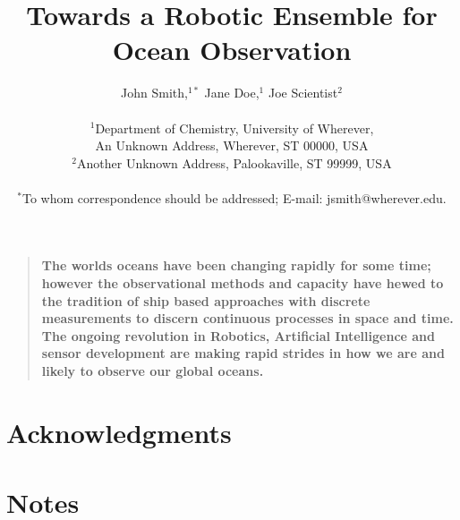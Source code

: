 \documentclass[12pt]{article}
\title{Towards a Robotic Ensemble for Ocean Observation}
\author
{John Smith,$^{1\ast}$ Jane Doe,$^{1}$ Joe Scientist$^{2}$\\
\\
\normalsize{$^{1}$Department of Chemistry, University of Wherever,}\\
\normalsize{An Unknown Address, Wherever, ST 00000, USA}\\
\normalsize{$^{2}$Another Unknown Address, Palookaville, ST 99999, USA}\\
\\
\normalsize{$^\ast$To whom correspondence should be addressed; E-mail:  jsmith@wherever.edu.}
}
\date{}
\newenvironment{sciabstract}{%
\begin{quote} \bf}
{\end{quote}}
\begin{document}
\baselineskip24pt


\maketitle 


\begin{sciabstract}
  The worlds oceans have been changing rapidly for some time; however
  the observational methods and capacity have hewed to the tradition
  of ship based approaches with discrete measurements to discern
  continuous processes in space and time.  The ongoing revolution in
  Robotics, Artificial Intelligence and sensor development are making
  rapid strides in how we are and likely to observe our global
  oceans. 
  
  
\end{sciabstract}





  








\section*{Acknowledgments}

\section{Notes}




\end{document}
